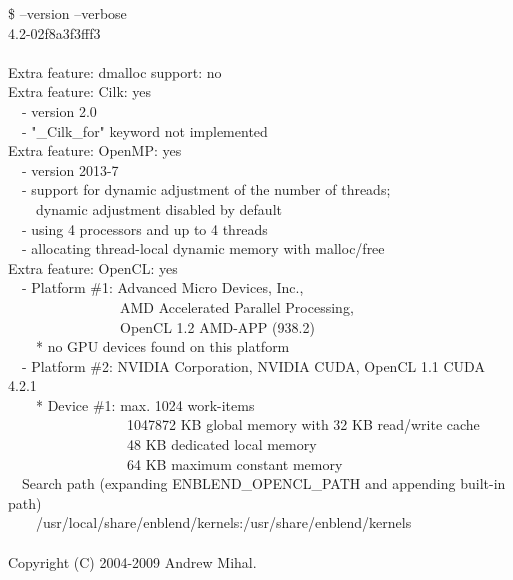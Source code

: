 \begin{exemplar}[htbp]
  \begin{maxipage}
    \centering
    \begin{terminal}
      \$ \app{} --version --verbose \\
      \app{} 4.2-02f8a3f3fff3 \\
      ~ \\
      Extra feature: dmalloc support: no \\
      Extra feature: Cilk: yes \\
      ~~- version 2.0 \\
      ~~- "\_Cilk\_for" keyword not implemented \\
      Extra feature: OpenMP: yes \\
      ~~- version 2013-7 \\
      ~~- support for dynamic adjustment of the number of threads; \\
      ~~~~dynamic adjustment disabled by default \\
      ~~- using 4 processors and up to 4 threads \\
      ~~- allocating thread-local dynamic memory with malloc/free \\
      Extra feature: OpenCL: yes \\
      ~~- Platform \#1: Advanced Micro Devices, Inc., \bslash \\
      ~~~~~~~~~~~~~~~~AMD Accelerated Parallel Processing, \bslash \\
      ~~~~~~~~~~~~~~~~OpenCL 1.2 AMD-APP (938.2) \\
      ~~~~* no GPU devices found on this platform \\
      ~~- Platform \#2: NVIDIA Corporation, NVIDIA CUDA, OpenCL 1.1 CUDA 4.2.1 \\
      ~~~~* Device \#1: max. 1024 work-items \\
      ~~~~~~~~~~~~~~~~~1047872 KB global memory with 32 KB read/write cache \\
      ~~~~~~~~~~~~~~~~~48 KB dedicated local memory \\
      ~~~~~~~~~~~~~~~~~64 KB maximum constant memory \\
      ~~Search path (expanding ENBLEND\_OPENCL\_PATH and appending built-in path) \\
      ~~~~/usr/local/share/enblend/kernels:/usr/share/enblend/kernels \\
      ~ \\
      Copyright (C) 2004-2009 Andrew Mihal. \\

\end{terminal}
\end{maxipage}
\end{exemplar}
